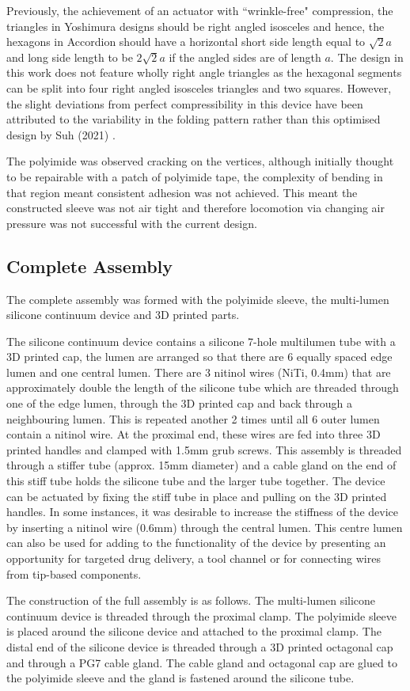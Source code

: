 Previously, the achievement of an actuator with ``wrinkle-free" compression, the triangles in Yoshimura designs should be right angled isosceles \cite{suh2021new} and hence, the hexagons in Accordion should have a horizontal short side length equal to $\sqrt{2}a$ and long side length to be $2\sqrt{2}a$ if the angled sides are of length $a$. The design in this work does not feature wholly right angle triangles as the hexagonal segments can be split into four right angled isosceles triangles and two squares. However, the slight deviations from perfect compressibility in this device have been attributed to the variability in the folding pattern rather than this optimised design by Suh (2021) \cite{suh2021new}.

The polyimide was observed cracking on the vertices, although initially thought to be repairable with a patch of polyimide tape, the complexity of bending in that region meant consistent adhesion was not achieved. This meant the constructed sleeve was not air tight and therefore locomotion via changing air pressure was not successful with the current design.



\subsection{Complete Assembly}
The complete assembly was formed with the polyimide sleeve, the multi-lumen silicone continuum device and 3D printed parts. 

The silicone continuum device contains a silicone 7-hole multilumen tube with a 3D printed cap, the lumen are arranged so that there are 6 equally spaced edge lumen and one central lumen. There are 3 nitinol wires (NiTi, 0.4mm) that are approximately double the length of the silicone tube which are threaded through one of the edge lumen, through the 3D printed cap and back through a neighbouring lumen. This is repeated another 2 times until all 6 outer lumen contain a nitinol wire. At the proximal end, these wires are fed into three 3D printed handles and clamped with 1.5mm grub screws. This assembly is threaded through a stiffer tube (approx. 15mm diameter) and a cable gland on the end of this stiff tube holds the silicone tube and the larger tube together. The device can be actuated by fixing the stiff tube in place and pulling on the 3D printed handles. In some instances, it was desirable to increase the stiffness of the device by inserting a nitinol wire (0.6mm) through the central lumen. This centre lumen can also be used for adding to the functionality of the device by presenting an opportunity for targeted drug delivery, a tool channel or for connecting wires from tip-based components.


The construction of the full assembly is as follows. The multi-lumen silicone continuum device is threaded through the proximal clamp. The polyimide sleeve is placed around the silicone device and attached to the proximal clamp. The distal end of the silicone device is threaded through a 3D printed octagonal cap and through a PG7 cable gland. The cable gland and octagonal cap are glued to the polyimide sleeve and the gland is fastened around the silicone tube.

